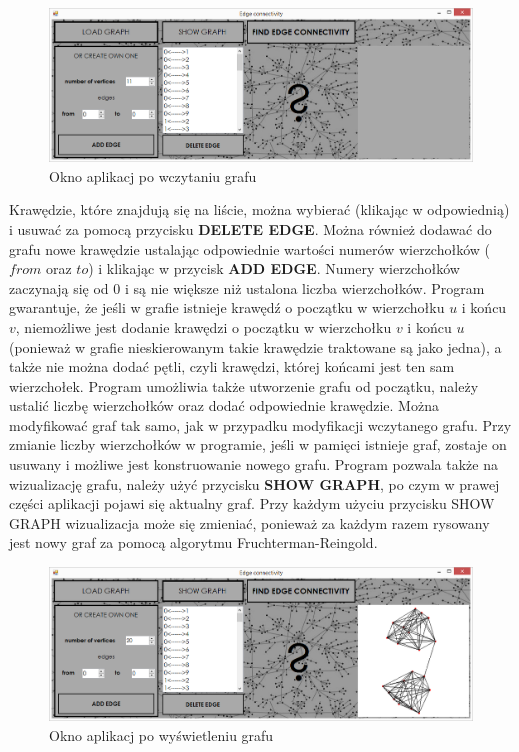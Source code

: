 \documentclass{article}
\begin{document}
\begin{figure}[H]
\centering
\includegraphics[scale=0.4]{02}
\caption{Okno aplikacj po wczytaniu grafu}
\end{figure}

Krawędzie, które znajdują się na liście, można wybierać (klikając w odpowiednią) i usuwać za pomocą przycisku \textbf{DELETE EDGE}. Można również dodawać do grafu nowe krawędzie ustalając odpowiednie wartości numerów wierzchołków ($from$ oraz $to$) i klikając w przycisk \textbf{ADD EDGE}. Numery wierzchołków zaczynają się od 0 i są nie większe niż ustalona liczba wierzchołków. Program gwarantuje, że jeśli w grafie istnieje krawędź o początku w wierzchołku $u$ i końcu $v$, niemożliwe jest dodanie krawędzi o początku w wierzchołku $v$ i końcu $u$ (ponieważ w grafie nieskierowanym takie krawędzie traktowane są jako jedna), a także nie można dodać pętli, czyli krawędzi, której końcami jest ten sam wierzchołek.
Program umożliwia także utworzenie grafu od początku, należy ustalić liczbę wierzchołków oraz dodać odpowiednie krawędzie. Można modyfikować graf tak samo, jak w przypadku modyfikacji wczytanego grafu.
Przy zmianie liczby wierzchołków w programie, jeśli w pamięci istnieje graf, zostaje on usuwany i możliwe jest konstruowanie nowego grafu.
Program pozwala także na wizualizację grafu, należy użyć przycisku \textbf{SHOW GRAPH}, po czym w prawej części aplikacji pojawi się aktualny graf. Przy każdym użyciu przycisku SHOW GRAPH wizualizacja może się zmieniać, ponieważ za każdym razem rysowany jest nowy graf za pomocą algorytmu Fruchterman-Reingold.
 
\begin{figure}[H]
\centering
\includegraphics[scale=0.4]{03}
\caption{Okno aplikacj po wyświetleniu grafu}
\end{figure}
 
\end{document}
